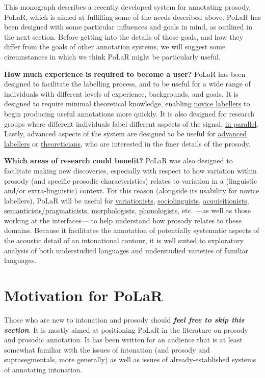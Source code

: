 This monograph describes a recently developed system for annotating prosody, PoLaR, which is  aimed at fulfilling some of the needs described above. PoLaR has been designed with some particular influences and goals in mind, as outlined in the next section. Before getting into the details of those goals, and how they differ from the goals of other annotation systems, we will suggest some circumstances in which we think PoLaR might be particularly useful.

\textbf{How much experience is required to become a user?} PoLaR has been designed to facilitate the labelling process, and to be useful for a wide range of individuals with different levels of experience, backgrounds, and goals. It is designed to require minimal theoretical knowledge, enabling \uline{novice labellers} to begin producing useful annotations more quickly. It is also designed for research groups where different individuals label different aspects of the signal, \uline{in parallel}. Lastly, advanced aspects of the system are designed to be useful for \uline{advanced labellers} or \uline{theoreticians}, who are interested in the finer details of the prosody.

\textbf{Which areas of research could benefit?} PoLaR was also designed to facilitate making new discoveries, especially with respect to how variation within prosody (and specific prosodic characteristics) relates to variation in a (linguistic and/or extra-linguistic) context. For this reason (alongside its usability for novice labellers), PoLaR will be useful for \uline{variationists}, \uline{sociolinguists}, \uline{acquisitionists}, \uline{semanticists\slash pragmaticists}, \uline{morphologists}, \uline{phonologists}, etc. —as well as those working at the interfaces— to help understand how prosody relates to these domains. Because it facilitates the annotation of potentially systematic aspects of the acoustic detail of an intonational contour, it is well suited to exploratory analysis of both understudied languages and understudied varieties of familiar languages.

\section{Motivation for PoLaR}
Those who are new to intonation and prosody should \textit{\textbf{feel free to skip this section}}. It is mostly aimed at positioning PoLaR in the literature on prosody and prosodic annotation. It has been written for an audience that is at least somewhat familiar with the issues of intonation (and prosody and suprasegmentals, more generally) as well as issues of already-established systems of annotating intonation.

